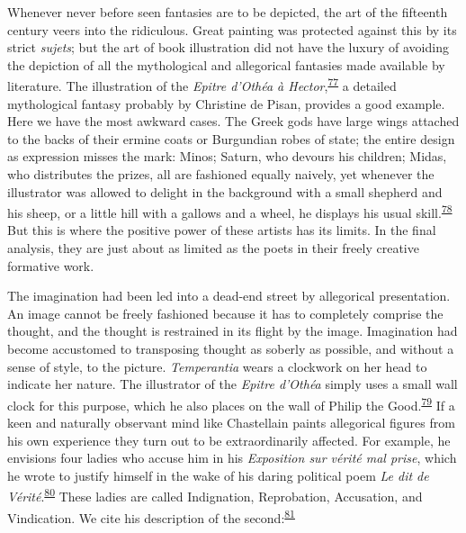 Whenever never before seen fantasies are to be depicted, the art of the
fifteenth century veers into the ridiculous. Great painting was
protected against this by its strict \emph{sujets}; but the art of book
illustration did not have the luxury of avoiding the depiction of all
the mythological and allegorical fantasies made available by literature.
The illustration of the \emph{Epitre d'Othéa à
Hector},\textsuperscript{\protect\hypertarget{21_Chapter_Thirteen__IMAGE_AND_WORD.xhtmlux5cux23id_158}{\protect\hyperlink{23_NOTES.xhtmlux5cux23id_159}{77}}}
a detailed mythological fantasy probably by Christine de Pisan, provides
a good example. Here we have the most awkward cases. The Greek gods have
large wings attached to the backs of their ermine coats or Burgundian
\protect\hypertarget{21_Chapter_Thirteen__IMAGE_AND_WORD.xhtmlux5cux23page_377}{}{}robes
of state; the entire design as expression misses the mark: Minos;
Saturn, who devours his children; Midas, who distributes the prizes, all
are fashioned equally naively, yet whenever the illustrator was allowed
to delight in the background with a small shepherd and his sheep, or a
little hill with a gallows and a wheel, he displays his usual
skill.\textsuperscript{\protect\hypertarget{21_Chapter_Thirteen__IMAGE_AND_WORD.xhtmlux5cux23id_156}{\protect\hyperlink{23_NOTES.xhtmlux5cux23id_157}{78}}}
But this is where the positive power of these artists has its limits. In
the final analysis, they are just about as limited as the poets in their
freely creative formative work.

The imagination had been led into a dead-end street by allegorical
presentation. An image cannot be freely fashioned because it has to
completely comprise the thought, and the thought is restrained in its
flight by the image. Imagination had become accustomed to transposing
thought as soberly as possible, and without a sense of style, to the
picture. \emph{Temperantia} wears a clockwork on her head to indicate
her nature. The illustrator of the \emph{Epitre d'Othéa} simply uses a
small wall clock for this purpose, which he also places on the wall of
Philip the
Good.\textsuperscript{\protect\hypertarget{21_Chapter_Thirteen__IMAGE_AND_WORD.xhtmlux5cux23id_154}{\protect\hyperlink{23_NOTES.xhtmlux5cux23id_155}{79}}}
If a keen and naturally observant mind like Chastellain paints
allegorical figures from his own experience they turn out to be
extraordinarily affected. For example, he envisions four ladies who
accuse him in his \emph{Exposition sur vérité mal prise}, which he wrote
to justify himself in the wake of his daring political poem \emph{Le dit
de
Vérité}.\textsuperscript{\protect\hypertarget{21_Chapter_Thirteen__IMAGE_AND_WORD.xhtmlux5cux23id_152}{\protect\hyperlink{23_NOTES.xhtmlux5cux23id_153}{80}}}
These ladies are called Indignation, Reprobation, Accusation, and
Vindication. We cite his description of the
second:\textsuperscript{\protect\hypertarget{21_Chapter_Thirteen__IMAGE_AND_WORD.xhtmlux5cux23id_150}{\protect\hyperlink{23_NOTES.xhtmlux5cux23id_151}{81}}}

